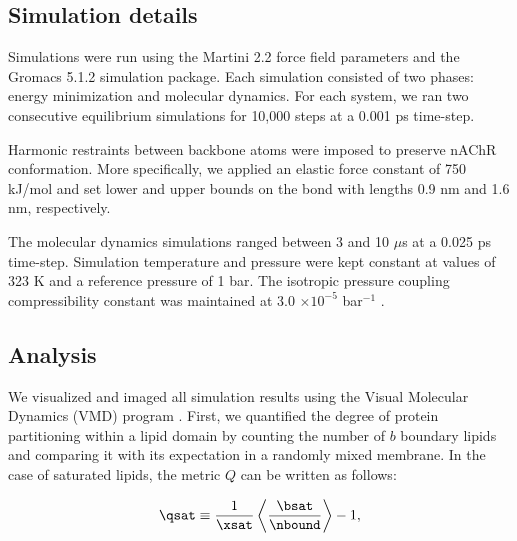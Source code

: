 \subsection{Simulation details}
Simulations were run using the Martini 2.2 force field parameters and the Gromacs 5.1.2 simulation package.\cite{Marrink2007, Pronk2013} Each simulation consisted of two phases: energy minimization and molecular dynamics. For each system, we ran two consecutive equilibrium simulations for 10,000 steps at a 0.001 ps time-step.  


Harmonic restraints between backbone atoms were imposed to preserve nAChR conformation. More specifically, we applied an elastic force constant of 750 kJ/mol and set lower and upper bounds on the bond with lengths 0.9 nm and 1.6 nm, respectively\cite{Marrink2007, Pronk2013}.  

 
The molecular dynamics simulations ranged between 3 and 10 $\mu$s at a 0.025 ps time-step. Simulation temperature and pressure were kept constant at values of 323 K and a reference pressure of 1 bar. The isotropic pressure coupling compressibility constant was maintained at 3.0 $\times {10^{-5}}$ bar$^{-1}$ .





\subsection{Analysis}
We visualized and imaged all simulation results using the Visual Molecular Dynamics (VMD) program \cite{HUMP96}. First, we quantified the degree of protein partitioning within a lipid domain by counting the number of $b$ boundary lipids and comparing it with its expectation in a randomly mixed membrane. In the case of saturated lipids, the metric $Q$ can be written as follows:


\begin{equation}
    \begin{aligned}
      \qsat\equiv \frac{1}{\xsat}\left\langle\frac{  \bsat }{\nbound }\right\rangle-1,\\
    \end{aligned}
    \label{eq:Q}
  \end{equation}


